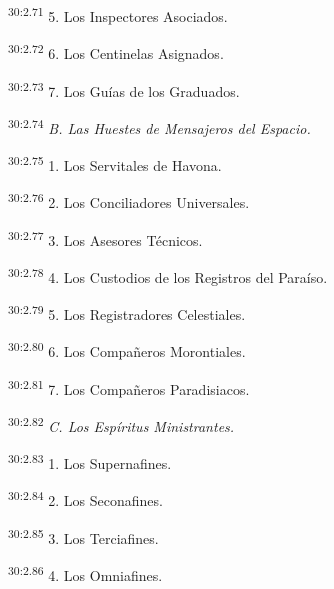 \par
\textsuperscript{30:2.71} 5. Los Inspectores Asociados.

\par
\textsuperscript{30:2.72} 6. Los Centinelas Asignados.

\par
\textsuperscript{30:2.73} 7. Los Guías de los Graduados.

\par
\textsuperscript{30:2.74} \textit{B. Las Huestes de Mensajeros del Espacio.}

\par
\textsuperscript{30:2.75} 1. Los Servitales de Havona.

\par
\textsuperscript{30:2.76} 2. Los Conciliadores Universales.

\par
\textsuperscript{30:2.77} 3. Los Asesores Técnicos.

\par
\textsuperscript{30:2.78} 4. Los Custodios de los Registros del Paraíso.

\par
\textsuperscript{30:2.79} 5. Los Registradores Celestiales.

\par
\textsuperscript{30:2.80} 6. Los Compañeros Morontiales.

\par
\textsuperscript{30:2.81} 7. Los Compañeros Paradisiacos.

\par
\textsuperscript{30:2.82} \textit{C. Los Espíritus Ministrantes.}

\par
\textsuperscript{30:2.83} 1. Los Supernafines.

\par
\textsuperscript{30:2.84} 2. Los Seconafines.

\par
\textsuperscript{30:2.85} 3. Los Terciafines.

\par
\textsuperscript{30:2.86} 4. Los Omniafines.

